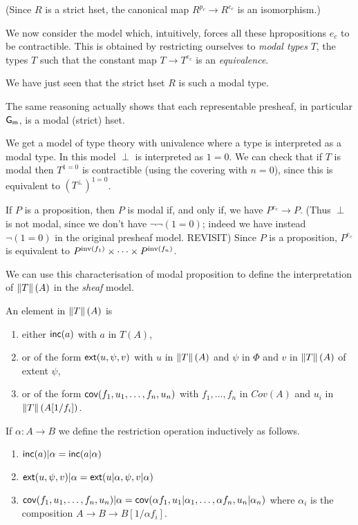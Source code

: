 (Since $R$ is a strict hset, the canonical map $R^{p_c}\rightarrow R^{e_c}$ is an isomorphism.)

We now consider the model which, intuitively, forces all these hpropositions $e_c$ to be contractible.
This is obtained by restricting ourselves to {\em modal types} $T$, the types
$T$ such that the constant map $T\rightarrow T^{e_c}$ is an {\em equivalence}.

\medskip

We have just seen that the strict hset $R$ is such a modal type.

The same reasoning actually shows that each representable presheaf, in particular $\mathsf{G_m}$, is a modal
(strict) hset.

\medskip

We get a model of type theory with univalence where a type is interpreted as a modal type.
In this model $\perp$ is interpreted as $1=0$. We can check that if $T$ is modal then
$T^{1=0}$ is contractible (using the covering with $n=0$), since this is equivalent to $(T^{\perp})^{1=0}$.

\medskip

If $P$ is a proposition, then $P$ is modal if, and only if,
we have $P^{e_c}\rightarrow P$.
(Thus $\perp$ is not modal, since we don't have $\neg\neg(1=0)$; indeed we have instead $\neg(1=0)$ in
the original presheaf model.
{\color{red} REVISIT})
Since $P$ is a
proposition, $P^{e_c}$ is equivalent to $P^{\mathrm{inv}(f_1)}\times \dots\times P^{\mathrm{inv}(f_n)}$.

\medskip

We can use this characterisation of modal proposition to define the interpretation of
$\left\lVert T \right\rVert(A)$ in the {\em sheaf} model.

An element in $\left\lVert T \right\rVert(A)$ is
\begin{enumerate}
\item either $\mathsf{inc}(a)$ with $a$ in $T(A)$,
\item or of the form $\mathsf{ext}(u,\psi,v)$ with $u$ in $\left\lVert T \right\rVert(A)$ and $\psi$ in $\Phi$ and
  $v$ in $\left\lVert T \right\rVert(A)$ of extent $\psi$,
\item or of the form $\mathsf{cov}(f_1,u_1,\dots,f_n,u_n)$ with $f_1,\dots,f_n$ in $Cov(A)$ and $u_i$ in $\left\lVert T \right\rVert(A[1/f_i])$.
\end{enumerate}

If $\alpha:A\rightarrow B$ we define the restriction operation inductively as follows.
\begin{enumerate}
\item $\mathsf{inc}(a)|\alpha = \mathsf{inc}(a|\alpha)$
\item $\mathsf{ext}(u,\psi,v)|\alpha = \mathsf{ext}(u|\alpha,\psi,v|\alpha)$
\item $\mathsf{cov}(f_1,u_1,\dots,f_n,u_n)|\alpha = \mathsf{cov}(\alpha f_1,u_1|\alpha_1,\dots,\alpha f_n,u_n|\alpha_n)$ where
  $\alpha_i$ is the composition $A\rightarrow B\rightarrow B[1/\alpha f_i]$.
\end{enumerate}


